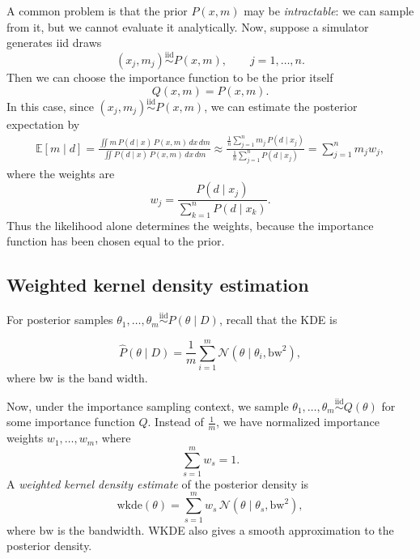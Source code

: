 \documentclass[11pt, titlepage]{article} %
\numberwithin{equation}{section}
\theoremstyle{definition}
\numberwithin{assumption}{section}
\begin{document}
A common problem is that the prior $P(x,m)$ may be \textit{intractable}: we can sample from it, but we cannot evaluate it analytically. Now, suppose a simulator generates iid draws
\begin{equation*}
    (x_j,m_j)\overset{\mathrm{iid}}{\sim} P(x,m),
    \qquad j=1,\dots,n.
\end{equation*}
Then we can choose the importance function to be the prior itself
\begin{equation*}
    Q(x,m)=P(x,m).
\end{equation*}
In this case, since $(x_j,m_j)\overset{\mathrm{iid}}{\sim} P(x,m)$, we can estimate the posterior expectation by
\begin{align*}
    \mathbb{E}[m\mid d]
    =
    \frac{\iint m\,P(d\mid x)\,P(x,m)\,dx\,dm}
    {\iint P(d\mid x)\,P(x,m)\,dx\,dm}\approx
    \frac{\frac{1}{n}\sum_{j=1}^n m_j\,P(d\mid x_j)}
    {\frac{1}{n}\sum_{j=1}^n P(d\mid x_j)}=
    \sum_{j=1}^n m_j w_j,
\end{align*}
where the weights are
\begin{equation*}
    w_j=
    \frac{P(d\mid x_j)}
    {\sum_{k=1}^n P(d\mid x_k)}.
\end{equation*}
Thus the likelihood alone determines the weights, because the importance function has been chosen equal to the prior.




\subsection{Weighted kernel density estimation}

For posterior samples $\theta_1,\dots,\theta_m \overset{\mathrm{iid}}{\sim} P(\theta\mid D)$, recall that the KDE is 

\begin{equation*}
    \hat P(\theta\mid D)
    =
    \frac{1}{m}\sum_{i=1}^m \mathcal{N}(\theta\mid \theta_i,\mathrm{bw}^2),
\end{equation*}
where bw is the band width.

Now, under the importance sampling context, we sample $\theta_1,\dots,\theta_m \overset{\mathrm{iid}}{\sim} Q(\theta)$ for some importance function $Q$. Instead of $\frac{1}{m}$, we have normalized importance weights $w_1,\dots,w_m$, where
\begin{equation*}
    \sum_{s=1}^m w_s=1.
\end{equation*}
A \textit{weighted kernel density estimate} of the posterior density is
\begin{equation*}
    \mathrm{wkde}(\theta)
    =
    \sum_{s=1}^m w_s\,\mathcal{N}(\theta\mid \theta_s,\mathrm{bw}^2),
\end{equation*}
where $\mathrm{bw}$ is the bandwidth.
WKDE also gives a smooth approximation to the posterior density.
\end{document}
